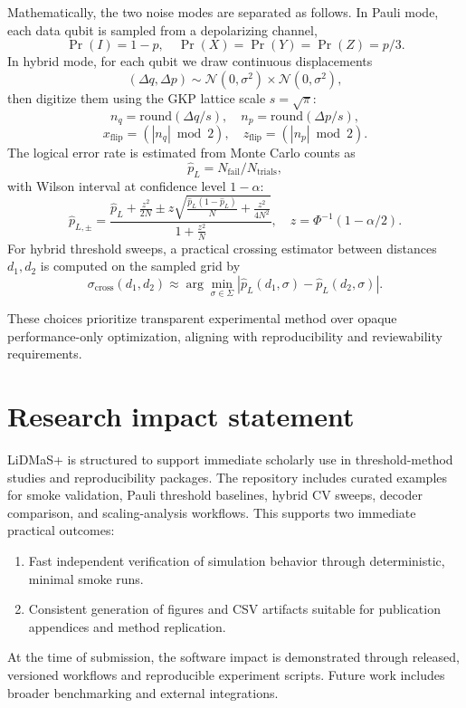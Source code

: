 \documentclass[
]{article}
\providecommand{\tightlist}{%
  \setlength{\itemsep}{0pt}\setlength{\parskip}{0pt}}
\begin{document}
Mathematically, the two noise modes are separated as follows. In Pauli
mode, each data qubit is sampled from a depolarizing channel, \[
\Pr(I)=1-p,\quad \Pr(X)=\Pr(Y)=\Pr(Z)=p/3.
\] In hybrid mode, for each qubit we draw continuous displacements \[
(\Delta q,\Delta p)\sim \mathcal{N}(0,\sigma^2)\times\mathcal{N}(0,\sigma^2),
\] then digitize them using the GKP lattice scale \(s=\sqrt{\pi}\): \[
n_q=\mathrm{round}(\Delta q/s),\quad n_p=\mathrm{round}(\Delta p/s),
\] \[
x_{\mathrm{flip}} = (|n_q|\bmod 2),\quad z_{\mathrm{flip}} = (|n_p|\bmod 2).
\] The logical error rate is estimated from Monte Carlo counts as \[
\hat{p}_L = N_{\mathrm{fail}}/N_{\mathrm{trials}},
\] with Wilson interval at confidence level \(1-\alpha\): \[
\hat{p}_{L,\pm}=
\frac{\hat{p}_L+\frac{z^2}{2N}\pm z\sqrt{\frac{\hat{p}_L(1-\hat{p}_L)}{N}+\frac{z^2}{4N^2}}}
{1+\frac{z^2}{N}},
\quad z=\Phi^{-1}(1-\alpha/2).
\] For hybrid threshold sweeps, a practical crossing estimator between
distances \(d_1,d_2\) is computed on the sampled grid by \[
\sigma_{\mathrm{cross}}(d_1,d_2)\approx
\arg\min_{\sigma\in\Sigma}\left|\hat{p}_L(d_1,\sigma)-\hat{p}_L(d_2,\sigma)\right|.
\]

These choices prioritize transparent experimental method over opaque
performance-only optimization, aligning with reproducibility and
reviewability requirements.

\section{Research impact statement}\label{research-impact-statement}

LiDMaS+ is structured to support immediate scholarly use in
threshold-method studies and reproducibility packages. The repository
includes curated examples for smoke validation, Pauli threshold
baselines, hybrid CV sweeps, decoder comparison, and scaling-analysis
workflows. This supports two immediate practical outcomes:

\begin{enumerate}
\def\labelenumi{\arabic{enumi}.}
\tightlist
\item
  Fast independent verification of simulation behavior through
  deterministic, minimal smoke runs.
\item
  Consistent generation of figures and CSV artifacts suitable for
  publication appendices and method replication.
\end{enumerate}

At the time of submission, the software impact is demonstrated through
released, versioned workflows and reproducible experiment scripts.
Future work includes broader benchmarking and external integrations.
\end{document}
